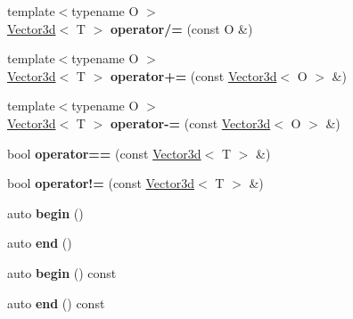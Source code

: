 \begin{DoxyCompactItemize}
{\footnotesize template$<$typename O $>$ }\\\mbox{\hyperlink{classenhance_1_1Vector3d}{Vector3d}}$<$ T $>$ {\bfseries operator/=} (const O \&)
\item 
\mbox{\label{classenhance_1_1Vector3d_a7c7e17a102212918dbad00d014272399}} 
{\footnotesize template$<$typename O $>$ }\\\mbox{\hyperlink{classenhance_1_1Vector3d}{Vector3d}}$<$ T $>$ {\bfseries operator+=} (const \mbox{\hyperlink{classenhance_1_1Vector3d}{Vector3d}}$<$ O $>$ \&)
\item 
\mbox{\label{classenhance_1_1Vector3d_af45886b1230accc137684d9c5c0b4bb5}} 
{\footnotesize template$<$typename O $>$ }\\\mbox{\hyperlink{classenhance_1_1Vector3d}{Vector3d}}$<$ T $>$ {\bfseries operator-\/=} (const \mbox{\hyperlink{classenhance_1_1Vector3d}{Vector3d}}$<$ O $>$ \&)
\item 
\mbox{\label{classenhance_1_1Vector3d_adb2099ce6415581adc90c9e4ba9ca2c5}} 
bool {\bfseries operator==} (const \mbox{\hyperlink{classenhance_1_1Vector3d}{Vector3d}}$<$ T $>$ \&)
\item 
\mbox{\label{classenhance_1_1Vector3d_a8423258933d5ec4eb332eae304735b62}} 
bool {\bfseries operator!=} (const \mbox{\hyperlink{classenhance_1_1Vector3d}{Vector3d}}$<$ T $>$ \&)
\item 
\mbox{\label{classenhance_1_1Vector3d_a1a640f95c426d1fc38f6ae12724c3525}} 
auto {\bfseries begin} ()
\item 
\mbox{\label{classenhance_1_1Vector3d_a1939d73182d30e43102ac97cdf33d855}} 
auto {\bfseries end} ()
\item 
\mbox{\label{classenhance_1_1Vector3d_abeedf79cf94982e0f317bfe639525451}} 
auto {\bfseries begin} () const
\item 
\mbox{\label{classenhance_1_1Vector3d_a39871f95c19f81debcb1fc20dacd6e2b}} 
auto {\bfseries end} () const
\item 
\mbox{\label{classenhance_1_1Vector3d_a016878b0ff0d248197ea6d4e8ac2e931}} 

\end{DoxyCompactItemize}
